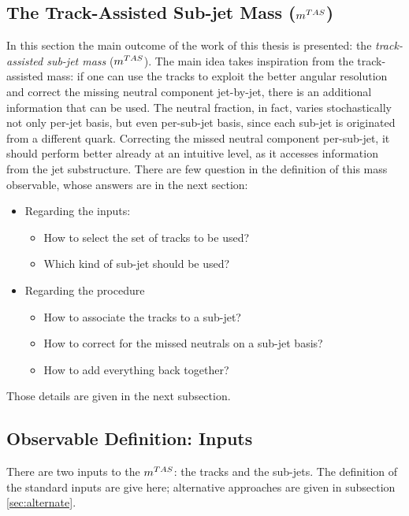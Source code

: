 \subsection{The Track-Assisted Sub-jet Mass ($m^{TAS}$)}\label{subsec:mtas}
In this section the main outcome of the work of this thesis is presented: the \textit{track-assisted sub-jet mass} ($m^{TAS}$).
The main idea takes inspiration from the track-assisted mass: if one can use the tracks to exploit the better angular resolution and correct the missing neutral component jet-by-jet, there is an additional information that can be used. The neutral fraction, in fact, varies stochastically not only per-jet basis, but even per-sub-jet basis, since each sub-jet is originated from a different quark.
Correcting the missed neutral component per-sub-jet, it should perform better already at an intuitive level, as it accesses information from the jet substructure.
There are few question in the definition of this mass observable, whose answers are in the next section:
\begin{itemize}
  \item Regarding the inputs:
  \begin{itemize}
     \item How to select the set of tracks to be used?
     \item Which kind of sub-jet should be used?
  \end{itemize}
  \item Regarding the procedure
  \begin{itemize}
  
  \item How to associate the tracks to a sub-jet?
  \item How to correct for the missed neutrals on a sub-jet basis?
  \item How to add everything back together?
 \end{itemize} 
 
\end{itemize}

Those details are given in the next subsection.


\subsection{Observable Definition: Inputs}
There are two inputs to the $m^{TAS}$: the tracks and the sub-jets. The definition of the standard inputs are give here; alternative approaches are given in subsection \ref{sec:alternate}.

